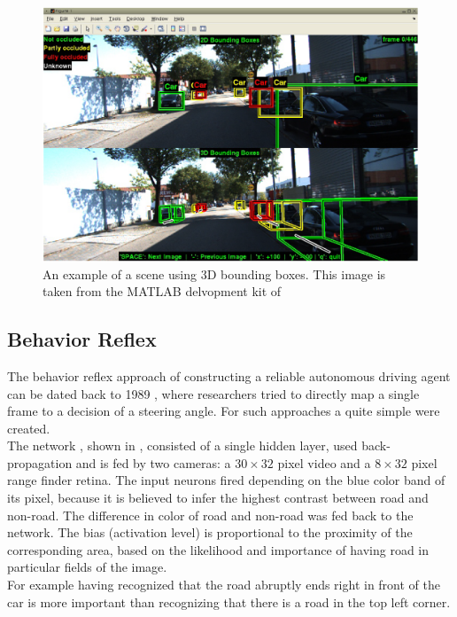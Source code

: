 \begin{figure}
	\centering
	\includegraphics[scale=0.4]{src/pic/3D-boundingbox-example.png}
	\caption{An example of a scene using 3D bounding boxes. This image is taken from the MATLAB delvopment kit of \cite{KITTI}}
	\label{pic: 3D Bounding Box}
\end{figure}

\subsection{Behavior Reflex}\label{subsec: Behavior Reflex}

The behavior reflex approach of constructing a reliable autonomous driving agent can be dated back to 1989 , where researchers tried to directly map a single frame to a decision of a steering angle. For such approaches a quite simple \nn were created. \\
The network \alvinn, shown in , consisted of a single hidden layer, used back-propagation and is fed by two cameras: a $30\times32$ pixel video and a $8\times32$ pixel range finder retina. The input neurons fired depending on the blue color band of its pixel, because it is believed to infer the highest contrast between road and non-road. The difference in color of road and non-road was fed back to the network. The bias (activation level) is proportional to the proximity of the corresponding area, based on the likelihood and importance of having road in particular fields of the image.\cite{pomerleau1989alvinn}\\
For example having recognized that the road abruptly ends right in front of the car is more important than recognizing that there is a road in the top left corner.\\

